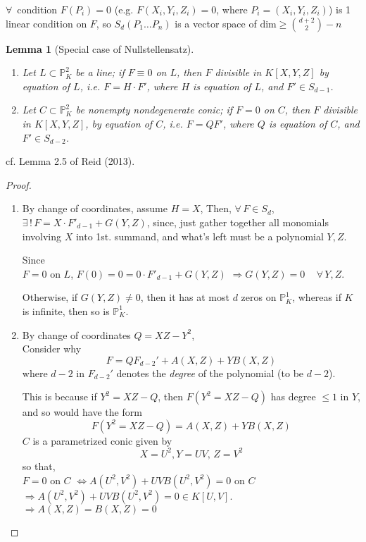 \documentclass[10pt]{amsart}
\newtheorem{lemma}{Lemma}
\begin{document}
\begin{multicols*}{2}
$\forall \, $ condition $F(P_i) = 0$ (e.g. $F(X_i, Y_i, Z_i) =0$, where $P_i = (X_i, Y_i, Z_i)$) is 1 linear condition on $F$, so $S_d(P_1 \dots P_n)$ is a vector space of $\text{dim} \geq \binom{ d+2}{2} - n$

\begin{lemma}[Special case of Nullstellensatz]\label{Lem:SpecialCaseOfNullstellensatz}
	\begin{enumerate}
		\item[(i)] Let $L \subset \mathbb{P}_K^2$ be a line; if $F \equiv 0$ on $L$, then $F$ divisible in $K[X, Y, Z]$ by equation of $L$, i.e. $F = H \cdot F'$, where $H$ is equation of $L$, and $F' \in S_{d-1}$. 
		\item[(ii)] Let $C \subset \mathbb{P}^2_K$ be nonempty nondegenerate conic; if $F =0$ on $C$, then $F$ divisible in $K[X,Y,Z]$, by equation of $C$, i.e. $F = QF'$, where $Q$ is equation of $C$, and $F' \in S_{d-2}$. 
	\end{enumerate}
\end{lemma}

cf. Lemma 2.5 of Reid (2013). 

\begin{proof}
\begin{enumerate}
	\item[(i)] By change of coordinates, assume $H = X$, 
	Then, $\forall \, F \in S_d$, $\exists \, ! \, F = X \cdot F'_{d-1} + G(Y,Z)$, since, just gather together all monomials involving $X$ into 1st. summand, and what's left must be a polynomial $Y,Z$.
	
	Since \\
	$F = 0$ on $L$, $F(0) = 0 = 0 \cdot F'_{d-1} + G(Y,Z) $ $\Longrightarrow G(Y,Z) = 0\quad \, \forall \, Y,Z$. 
	
	Otherwise, if $G(Y,Z) \neq 0$, then it has at most $d$ zeros on $\mathbb{P}_K^1$, whereas if $K$ is infinite, then so is $\mathbb{P}_K^1$.  
	\item[(ii)] By change of coordinates $Q = XZ - Y^2$, \\ 
	Consider why 
	\[
	F = QF_{d-2}' + A(X,Z) + YB(X,Z)
	\]
	where $d-2$ in $F_{d-2}'$ denotes the \emph{degree} of the polynomial (to be $d-2$).
	
	This is because if $Y^2 = XZ - Q$, then $F(Y^2 = XZ - Q)$ has degree $\leq 1$ in $Y$, and so would have the form 
	\[
	F(Y^2 = XZ - Q) = A(X,Z) + YB(X,Z)
	\]
	$C$ is a parametrized conic given by 
	\[
	X = U^2 , Y = UV, \, Z = V^2
	\]
	so that, \\
	$F = 0$ on $C$ $\Longleftrightarrow  A(U^2, V^2) + UVB(U^2 , V^2) = 0$ on $C$ \\
	$\Longrightarrow A(U^2, V^2) + UVB(U^2 , V^2)  =0  \in K[U,V]$. \\
	$\Longrightarrow A(X,Z) = B(X,Z) =0 $
	

\end{enumerate}
\end{proof}
\end{multicols*}
\end{document}
